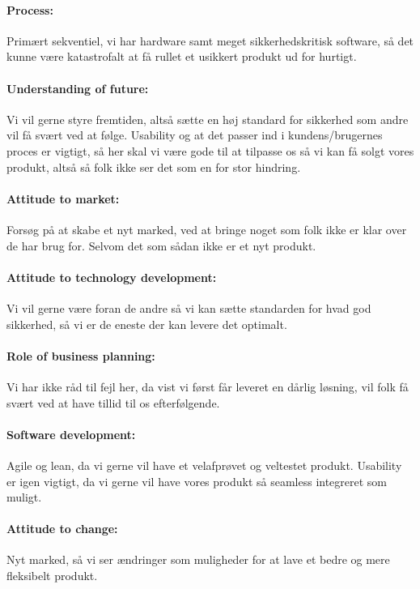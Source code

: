 \documentclass[a4paper]{article}
\begin{document}
\paragraph{Process:} Primært sekventiel, vi har hardware samt meget sikkerhedskritisk software, så det kunne være katastrofalt at få rullet et usikkert produkt ud for hurtigt.

\paragraph{Understanding of future:} Vi vil gerne styre fremtiden, altså sætte en høj standard for sikkerhed som andre vil få svært ved at følge.
Usability og at det passer ind i kundens/brugernes proces er vigtigt, så her skal vi være gode til at tilpasse os så vi kan få solgt vores produkt, altså så folk ikke ser det som en for stor hindring.

\paragraph{Attitude to market:} Forsøg på at skabe et nyt marked, ved at bringe noget som folk ikke er klar over de har brug for.
Selvom det som sådan ikke er et nyt produkt.

\paragraph{Attitude to technology development:} Vi vil gerne være foran de andre så vi kan sætte standarden for hvad god sikkerhed, så vi er de eneste der kan levere det optimalt.

\paragraph{Role of business planning:} Vi har ikke råd til fejl her, da vist vi først får leveret en dårlig løsning, vil folk få svært ved at have tillid til os efterfølgende.

\paragraph{Software development:} Agile og lean, da vi gerne vil have et velafprøvet og veltestet produkt.
Usability er igen vigtigt, da vi gerne vil have vores produkt så seamless integreret som muligt.

\paragraph{Attitude to change:} Nyt marked, så vi ser ændringer som muligheder for at lave et bedre og mere fleksibelt produkt.
\end{document}
